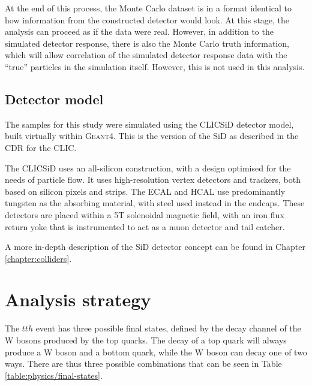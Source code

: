At the end of this process, the Monte Carlo dataset is in a format identical to how information from the constructed detector would look. At this stage, the analysis can proceed as if the data were real. However, in addition to the simulated detector response, there is also the Monte Carlo truth information, which will allow correlation of the simulated detector response data with the ``true'' particles in the simulation itself. However, this is not used in this analysis.

\subsection{Detector model}
The samples for this study were simulated using the CLIC\textunderscore SiD detector model, built virtually within \textsc{Geant4}. This is the version of the \acrfull{SiD} as described in the \acrfull{CDR} for the \acrlong{CLIC}. 

The CLIC\textunderscore SiD uses an all-silicon construction, with a design optimised for the needs of particle flow. It uses high-resolution vertex detectors and trackers, both based on silicon pixels and strips. The \acrshort{ECAL} and \acrshort{HCAL} use predominantly tungsten as the absorbing material, with steel used instead in the endcaps. These detectors are placed within a 5T solenoidal magnetic field, with an iron flux return yoke that is instrumented to act as a muon detector and tail catcher.

A more in-depth description of the \acrshort{SiD} detector concept can be found in Chapter \ref{chapter:colliders}.

\section{Analysis strategy}

The $tth$ event has three possible final states, defined by the decay channel of the W bosons produced by the top quarks. The decay of a top quark will always produce a W boson and a bottom quark, while the W boson can decay one of two ways. There are thus three possible combinations that can be seen in Table \ref{table:physics/final-states}. \\

